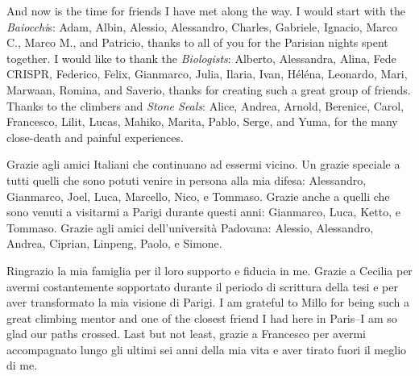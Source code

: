 And now is the time for friends I have met along the way. I would start with the \emph{Baiocchi}s:
Adam,
Albin,
Alessio,
Alessandro,
Charles,
Gabriele,
Ignacio,
Marco C.,
Marco M., and
Patricio, thanks to all of you for the Parisian nights spent together.
I would like to thank the \emph{Biologists}:
Alberto,
Alessandra,
Alina,
Fede CRISPR,
Federico,
Felix,
Gianmarco,
Julia,
Ilaria,
Ivan,
Héléna,
Leonardo,
Mari,
Marwaan,
Romina,
and Saverio, thanks for creating such a great group of friends.
Thanks to the climbers and \emph{Stone Seals}:
Alice,
Andrea,
Arnold,
Berenice,
Carol,
Francesco,
Lilit,
Lucas,
Mahiko,
Marita,
Pablo,
Serge,
and Yuma,
for the many close-death and painful experiences.

Grazie agli amici Italiani che continuano ad essermi vicino.
Un grazie speciale a tutti quelli che sono potuti venire in persona alla mia difesa:
Alessandro,
Gianmarco,
Joel,
Luca,
Marcello,
Nico,
e Tommaso.
Grazie anche a quelli che sono venuti a visitarmi a Parigi durante questi anni: Gianmarco, Luca, Ketto, e Tommaso.
Grazie agli amici dell'università Padovana:
Alessio,
Alessandro,
Andrea,
Ciprian,
Linpeng,
Paolo, e
Simone.

Ringrazio la mia famiglia per il loro supporto e fiducia in me. Grazie a Cecilia per avermi costantemente sopportato durante il periodo di scrittura della tesi e per aver transformato la mia visione di Parigi. I am grateful to Millo for being such a great climbing mentor and one of the closest friend I had here in Paris--I am so glad our paths crossed. Last but not least, grazie a Francesco per avermi accompagnato lungo gli ultimi sei anni della mia vita e aver tirato fuori il meglio di me.
